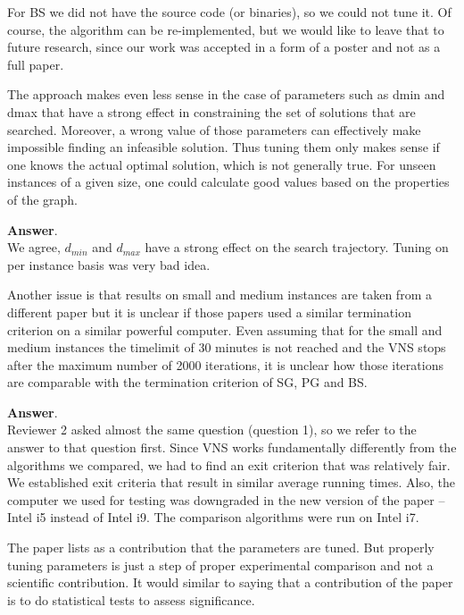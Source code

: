 \documentclass [11pt]{scrartcl}
\begin{document}
For BS we did not have the source code (or binaries), so we could not tune it.
Of course, the algorithm can be re-implemented, but we would like to leave that to future research, since our work was accepted in a form of   a poster and not as a full paper.

\begin{leftbar}
The approach makes even less sense in the case of parameters such as dmin and dmax that have a strong effect in constraining the set of solutions that are searched. Moreover, a wrong value of those parameters can effectively make impossible finding an infeasible solution. Thus tuning them only makes sense if one knows the actual optimal solution, which is not generally true. For unseen instances of a given size, one could calculate good values based on the properties of the graph.	
\end{leftbar}

\textbf{Answer}. \\
We agree, $d_{min}$ and $d_{max}$ have a strong effect on the search trajectory.  Tuning on per instance basis was very bad idea. 


\begin{leftbar}
Another issue is that results on small and medium instances are taken from a different paper but it is unclear if those papers used a similar termination criterion on a similar powerful computer. Even assuming that for the small and medium instances the timelimit of 30 minutes is not reached and the VNS stops after the maximum number of 2000 iterations, it is unclear how those iterations are comparable with the termination criterion of SG, PG and BS.
\end{leftbar}

\textbf{Answer}.\\
Reviewer 2 asked almost the same question (question 1), so we refer to   the answer to that question first.
Since VNS works fundamentally differently from the algorithms we compared, we had to find an exit criterion that was relatively fair. We established exit criteria that result in similar average running times. Also, the computer we used for testing was downgraded in the new version of the paper -- Intel i5 instead of Intel i9. The comparison algorithms were run on Intel i7.

\begin{leftbar}
The paper lists as a contribution that the parameters are tuned. But properly tuning parameters is just a step of proper experimental comparison and not a scientific contribution. It would similar to saying that a contribution of the paper is to do statistical tests to assess significance.
\end{leftbar}
\end{document}
